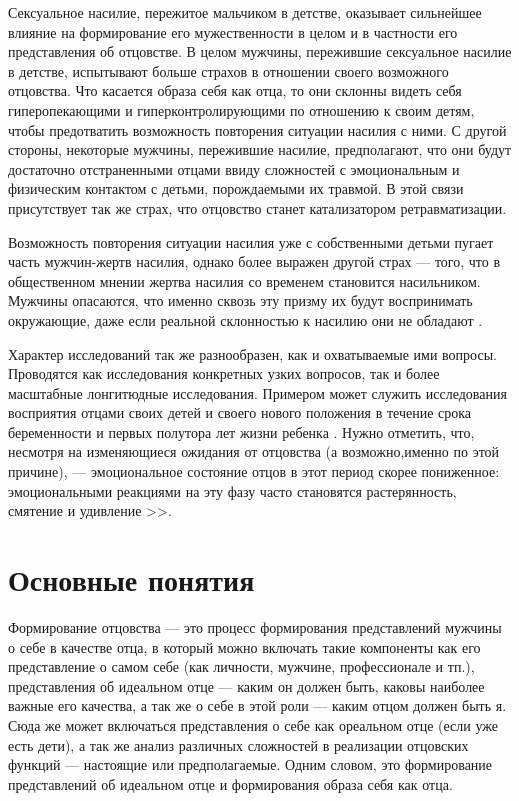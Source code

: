 \documentclass{../../common/thesisbyxetex}
\begin{document}
Сексуальное насилие, пережитое мальчиком в детстве, оказывает сильнейшее влияние на формирование 
его мужественности в целом и в частности его представления об отцовстве. В целом мужчины, 
пережившие сексуальное насилие в детстве, испытывают больше страхов в отношении своего возможного 
отцовства.  Что касается образа себя как отца, то они склонны видеть себя гиперопекающими  и 
гиперконтролирующими по отношению к своим детям, чтобы предотватить возможность повторения 
ситуации насилия с ними. С другой стороны, некоторые мужчины, пережившие насилие, предполагают, 
что они будут достаточно отстраненными отцами ввиду сложностей с эмоциональным и физическим 
контактом с детьми, порождаемыми их травмой. В этой связи присутствует так же страх, что отцовство 
станет катализатором ретравматизации.

Возможность повторения ситуации насилия уже с собственными детьми пугает часть мужчин-жертв 
насилия, однако более выражен другой страх --- того, что в общественном мнении жертва насилия 
со временем становится насильником. Мужчины опасаются, что именно сквозь эту призму их будут 
воспринимать окружающие, даже если реальной склонностью к насилию они не обладают \cite{sex}. 

Характер исследований так же разнообразен, как и охватываемые ими вопросы. Проводятся как 
исследования конкретных узких вопросов, так и более масштабные лонгитюдные исследования. Примером 
может служить исследования восприятия отцами своих детей и своего нового положения в течение срока 
беременности и первых полутора лет жизни ребенка \cite{percep}. Нужно отметить, что, несмотря на 
изменяющиеся ожидания от отцовства (а возможно,именно по этой причине), --- эмоциональное состояние 
отцов в этот период скорее пониженное: эмоциональными реакциями на эту фазу часто 
становятся растерянность, смятение и удивление \cite[12]{meta}>>.

\section{Основные понятия}

Формирование отцовства --- это процесс формирования представлений мужчины о себе в качестве отца, в 
который можно включать такие компоненты как его представление о самом себе (как личности, мужчине, 
профессионале и тп.), представления об идеальном отце --- каким он должен быть, каковы наиболее 
важные его качества, а так же о себе в этой роли --- каким отцом должен быть я. Сюда же может 
включаться представления о себе как ореальном отце (если уже есть дети), а так же анализ различных 
сложностей в реализации отцовских функций --- настоящие или предполагаемые. 
Одним словом, это формирование представлений об идеальном отце и формирования образа себя как отца.
\end{document}
